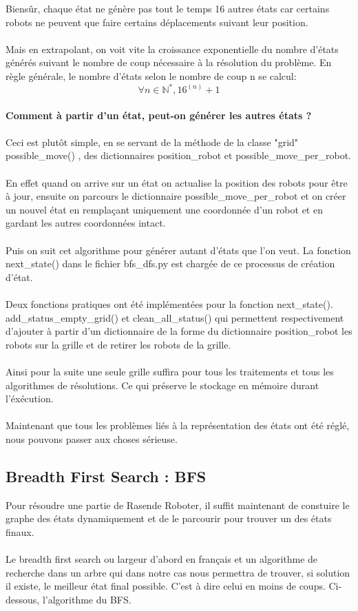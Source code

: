 \documentclass{article}
\begin{document}
Biensûr, chaque état ne génère pas tout le temps 16 autres états car certains robots ne peuvent que faire certains déplacements suivant leur position.\\\\
Mais en extrapolant, on voit vite la croissance exponentielle du nombre d'états générés suivant le nombre de coup nécessaire à la résolution du problème. En règle générale, le nombre d'états selon le nombre de coup n se calcul:\\ \[\forall n \in \mathbb{N^*} , 16^{(n)} + 1\] \\
\textbf{Comment à partir d'un état, peut-on générer les autres états ?}\\\\
Ceci est plutôt simple, en se servant de la méthode de la classe "grid" possible\_move() , des dictionnaires position\_robot et possible\_move\_per\_robot.\\\\
En effet quand on arrive sur un état on actualise la position des robots pour être à jour, ensuite on parcours le dictionnaire possible\_move\_per\_robot et on créer un nouvel état en remplaçant uniquement une coordonnée d'un robot et en gardant les autres coordonnées intact.\\\\
Puis on suit cet algorithme pour générer autant d'états que l'on veut. La fonction next\_state() dans le fichier bfs\_dfs.py est chargée de ce processus de création d'état.\\\\
Deux fonctions pratiques ont été implémentées pour la fonction next\_state(). add\_status\_empty\_grid() et clean\_all\_status() qui permettent respectivement d'ajouter à partir d'un dictionnaire de la forme du dictionnaire position\_robot les robots sur la grille et de retirer les robots de la grille.\\\\
Ainsi pour la suite une seule grille suffira pour tous les traitements et tous les algorithmes de résolutions. Ce qui préserve le stockage en mémoire durant l'éxécution.\\\\
Maintenant que tous les problèmes liés à la représentation des états ont été réglé, nous pouvons passer aux choses sérieuse.
\subsection{Breadth First Search : BFS}
Pour résoudre une partie de Rasende Roboter, il suffit maintenant de constuire le graphe des états dynamiquement et de le parcourir pour trouver un des états finaux.\\\\
Le breadth first search ou largeur d'abord en français et un algorithme de recherche dans un arbre qui dans notre cas nous permettra de trouver, si solution il existe, le meilleur état final possible. C'est à dire celui en moins de coups. Ci-dessous, l'algorithme du BFS.
\end{document}
